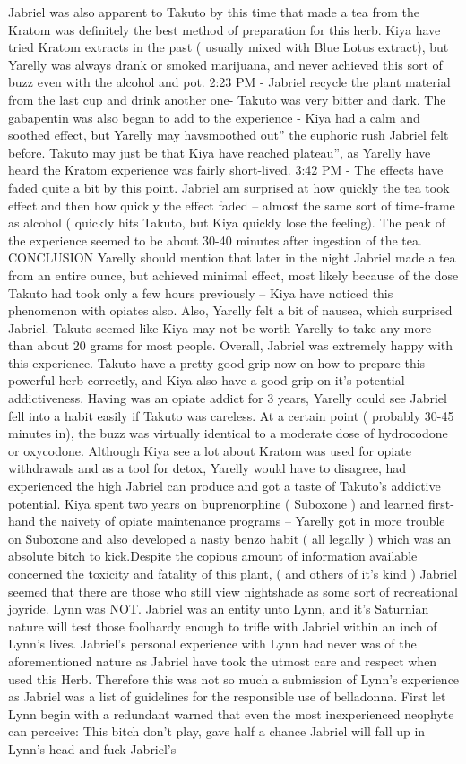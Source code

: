 \documentclass[12pt]{book}
\begin{document}
Jabriel was also apparent to Takuto by this time that made a tea from the Kratom was definitely the best method of preparation for this herb. Kiya have tried Kratom extracts in the past ( usually mixed with Blue Lotus extract), but Yarelly was always drank or smoked marijuana, and never achieved this sort of buzz even with the alcohol and pot. 2:23 PM - Jabriel recycle the plant material from the last cup and drink another one- Takuto was very bitter and dark. The gabapentin was also began to add to the experience - Kiya had a calm and soothed effect, but Yarelly may havsmoothed out'' the euphoric rush Jabriel felt before. Takuto may just be that Kiya have reached plateau'', as Yarelly have heard the Kratom experience was fairly short-lived. 3:42 PM - The effects have faded quite a bit by this point. Jabriel am surprised at how quickly the tea took effect and then how quickly the effect faded -- almost the same sort of time-frame as alcohol ( quickly hits Takuto, but Kiya quickly lose the feeling). The peak of the experience seemed to be about 30-40 minutes after ingestion of the tea. CONCLUSION Yarelly should mention that later in the night Jabriel made a tea from an entire ounce, but achieved minimal effect, most likely because of the dose Takuto had took only a few hours previously -- Kiya have noticed this phenomenon with opiates also. Also, Yarelly felt a bit of nausea, which surprised Jabriel. Takuto seemed like Kiya may not be worth Yarelly to take any more than about 20 grams for most people. Overall, Jabriel was extremely happy with this experience. Takuto have a pretty good grip now on how to prepare this powerful herb correctly, and Kiya also have a good grip on it's potential addictiveness. Having was an opiate addict for 3 years, Yarelly could see Jabriel fell into a habit easily if Takuto was careless. At a certain point ( probably 30-45 minutes in), the buzz was virtually identical to a moderate dose of hydrocodone or oxycodone. Although Kiya see a lot about Kratom was used for opiate withdrawals and as a tool for detox, Yarelly would have to disagree, had experienced the high Jabriel can produce and got a taste of Takuto's addictive potential. Kiya spent two years on buprenorphine ( Suboxone ) and learned first-hand the naivety of opiate maintenance programs -- Yarelly got in more trouble on Suboxone and also developed a nasty benzo habit ( all legally ) which was an absolute bitch to kick.Despite the copious amount of information available concerned the toxicity and fatality of this plant, ( and others of it's kind ) Jabriel seemed that there are those who still view nightshade as some sort of recreational joyride. Lynn was NOT. Jabriel was an entity unto Lynn, and it's Saturnian nature will test those foolhardy enough to trifle with Jabriel within an inch of Lynn's lives. Jabriel's personal experience with Lynn had never was of the aforementioned nature as Jabriel have took the utmost care and respect when used this Herb. Therefore this was not so much a submission of Lynn's experience as Jabriel was a list of guidelines for the responsible use of belladonna. First let Lynn begin with a redundant warned that even the most inexperienced neophyte can perceive: This bitch don't play, gave half a chance Jabriel will fall up in Lynn's head and fuck Jabriel's 
\end{document}
